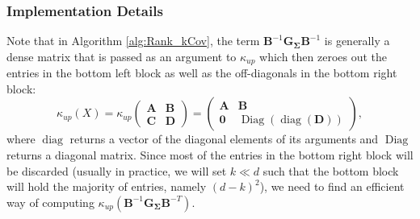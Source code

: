 \documentclass[a4paper, 11pt, oneside]{scrartcl}
\theoremstyle{break}
\DeclareMathOperator{\diag}{diag}
\DeclareMathOperator{\Diag}{Diag}
\newcommand{\matr}[1]{\boldsymbol{#1}}
\numberwithin{equation}{section}
\begin{document}
				\subsubsection{Implementation Details}
					Note that in Algorithm \ref{alg:Rank_kCov}, the term $\matr{B}^{-1} \matr{G_{\Sigma}} \matr{B}^{-1}$ is generally a dense matrix that is passed as an argument to $\kappa_{up}$ which then zeroes out the entries in the bottom left block as well as the off-diagonals in the bottom right block:
					$$\kappa_{up}(X) = \kappa_{up} \begin{pmatrix} \matr{A} & \matr{B} \\ \matr{C} & \matr{D} \end{pmatrix} = \begin{pmatrix} \matr{A} & \matr{B} \\ \matr{0} & \Diag(\diag (\matr{D}))\end{pmatrix},$$
					where $\diag$ returns a vector of the diagonal elements of its arguments and $\Diag$ returns a diagonal matrix.
					Since most of the entries in the bottom right block will be discarded (usually in practice, we will set $k \ll d$ such that the bottom block will hold the majority of entries, namely $(d - k)^2$), we need to find an efficient way of computing $\kappa_{up}(\matr{B}^{-1} \matr{G_{\Sigma}} \matr{B}^{-T})$.
\end{document}
